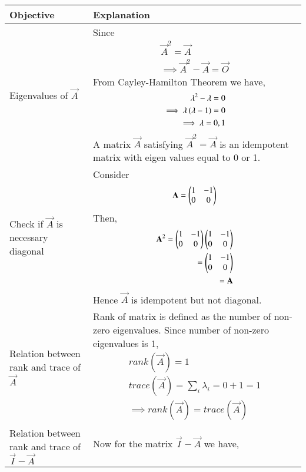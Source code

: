 \documentclass[journal,12pt,twocolumn]{IEEEtran}
\begin{document}
\begin{table}[htbp]
        \centering
	\begin{tabular}{|m{2.0in}|m{5.0in}|} \hline
		\textbf{Objective} & \textbf{Explanation} \\ \hline
		Eigenvalues of $\vec{A}$ & Since 
		\begin{align}
			\vec{A}^2=\vec{A} \\
		        \implies \vec{A}^2-\vec{A}=\vec{O}
		\end{align} 
From Cayley-Hamilton Theorem we have,
\begin{align}
        \lambda^2-\lambda=0 \\
        \implies \lambda\left(\lambda-1\right)=0 \\
        \implies \lambda=0,1
\end{align} 
	A matrix $\vec{A}$ satisfying $\vec{A}^2=\vec{A}$ is an idempotent matrix with eigen values
equal to 0 or 1. 	\\ \hline
Check if $\vec{A}$ is necessary diagonal & Consider
                \begin{align}
                        \mathbf{A}=\begin{pmatrix}1&-1\\0&0\end{pmatrix}\\
                \end{align}
                Then,
                \begin{align}
                        \mathbf{A}^2=\begin{pmatrix}1&-1\\0&0\end{pmatrix}\begin{pmatrix}1&-1\\0&0\end{pmatrix}\\
                        =\begin{pmatrix}1&-1\\0&0\end{pmatrix} \\
                        =\mathbf{A}
                \end{align}
                Hence $\vec{A}$ is idempotent but not diagonal. \\ \hline
Relation between rank and trace of $\vec{A}$ & Rank of matrix is defined as the number of non-zero eigenvalues. Since number of non-zero eigenvalues is 1,  
\begin{align} 
	rank(\vec{A})=1 \\
	trace(\vec{A})=\sum_i \lambda_i = 0+1 =1 \\
	\implies rank(\vec{A})=trace(\vec{A})
\end{align} \\ \hline
Relation between rank and trace of $\vec{I}-\vec{A}$ & Now for the matrix $\vec{I}-\vec{A}$ we have,
\begin{align}

\end{align}
\end{tabular}
\end{table}
\end{document}
